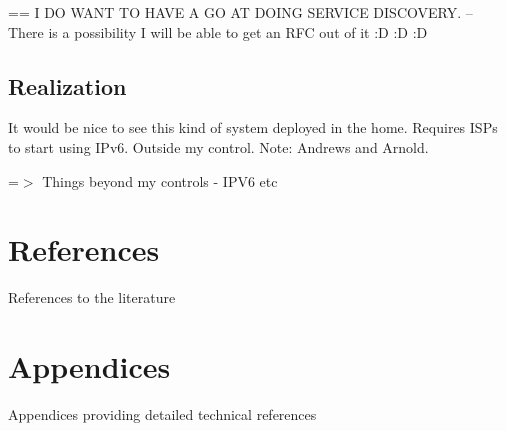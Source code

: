 \documentclass[12pt]{report}
\begin{document}
== I DO WANT TO HAVE A GO AT DOING SERVICE DISCOVERY.
-- There is a possibility I will be able to get an RFC out of it :D :D :D

\section{Realization}
It would be nice to see this kind of system deployed in the home. 
Requires ISPs to start using IPv6.
Outside my control. 
Note: Andrews and Arnold.

=$>$ Things beyond my controls - IPV6 etc

\chapter{References}
References to the literature

\chapter{Appendices}
Appendices providing detailed technical references
\end{document}
